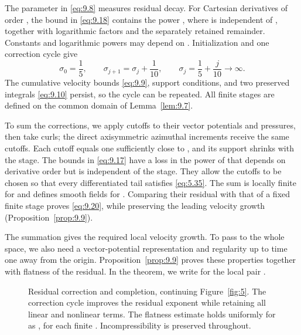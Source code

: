 The parameter  in \eqref{eq:9.8} measures residual decay. For Cartesian derivatives of order
, the bound in \eqref{eq:9.18} contains the power
, where  is independent of
, together with logarithmic factors and the separately retained remainder. Constants and logarithmic powers
may depend on . Initialization and one correction cycle give
\[
\sigma_0=\frac15,
\qquad
\sigma_{j+1}=\sigma_j+\frac1{10},
\qquad
\sigma_j=\frac15+\frac j{10}\longrightarrow\infty.
\]
The cumulative velocity bounds \eqref{eq:9.9}, support conditions, and two preserved integrals \eqref{eq:9.10}
persist, so the cycle can be repeated. All finite stages are defined on the common domain of
Lemma~\ref{lem:9.7}.

To sum the corrections, we apply cutoffs to their vector potentials and pressures, then take
curls; the direct axisymmetric azimuthal increments receive the same cutoffs. Each cutoff
equals one sufficiently close to , and its support shrinks with the stage. The bounds in
\eqref{eq:9.17} have a loss in the power of  that depends on derivative order but is independent of
the stage. They allow the cutoffs to be chosen so that every differentiated tail satisfies \eqref{eq:5.35}.
The sum is locally finite for  and defines smooth fields
 for . Comparing
their residual with that of a fixed finite stage proves \eqref{eq:9.20}, while preserving the leading
velocity growth (Proposition~\ref{prop:9.9}).

The summation gives the required local velocity growth. To pass to the whole space, we
also need a vector-potential representation and regularity up to time one away from the
origin. Proposition~\ref{prop:9.9} proves these properties together with flatness of the residual. In the
theorem, we write  for the local pair
.

%
\begin{figure}[htbp]
  \centering
  \caption{Residual correction and completion, continuing Figure~\ref{fig:5}. The
  correction cycle improves the residual exponent  while retaining all linear
  and nonlinear terms. The flatness estimate holds uniformly for
  as , for each finite . Incompressibility is preserved throughout.}
  \label{fig:6}
\end{figure}

